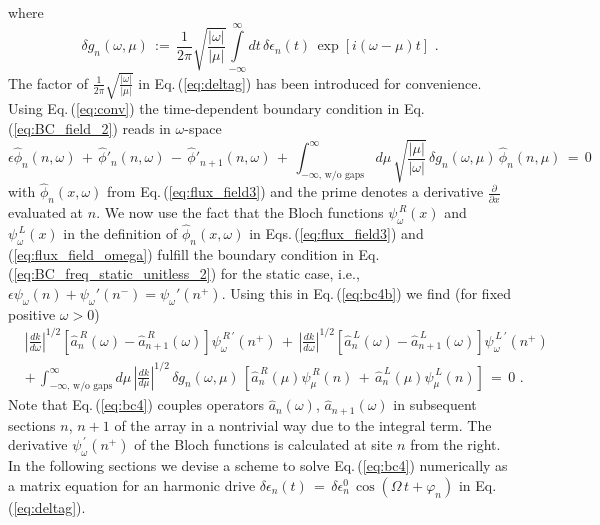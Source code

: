 %
where
%
\begin{equation} \label{eq:deltag}
\delta g_n(\omega, \mu) \, := \, \frac{1}{2 \pi}
\sqrt{\frac{|\omega|}{|\mu|}} \int\limits_{-\infty}^{\infty} dt \, \delta \epsilon_n(t) \, 
\exp\left[i (\omega-\mu) t \right] \, \, .
\end{equation}
%
The factor of $\displaystyle{\frac{1}{2 \pi} \sqrt{\frac{|\omega|}{|\mu|}}}$ 
in Eq.\,(\ref{eq:deltag}) has been introduced for convenience.
Using Eq.\,(\ref{eq:conv}) the time-dependent boundary condition in 
Eq.\,(\ref{eq:BC_field_2}) reads in $\omega$-space
%
\begin{equation} \label{eq:bc4b}
\epsilon \hat{\phi}_n(n,\omega) \, + \,
\hat{\phi}'_n(n,\omega) \, - \, \hat{\phi}'_{n+1}(n,\omega) \, + \,
\int_{-\infty, \, \text{w/o gaps}}^{\infty} d\mu \, \sqrt{\frac{|\mu|}{|\omega|}} \, 
\delta g_n(\omega, \mu) \, \hat{\phi}_n(n,\mu) 
 \, = \, 0
\end{equation}
%
with $\hat{\phi}_n(x,\omega)$ from Eq.\,(\ref{eq:flux_field3}) and
the prime denotes a derivative $\displaystyle{\frac{\partial}{\partial x}}$ evaluated at $n$.
We now use the fact that the Bloch functions $\psi_{\omega}^{\,R}(x)$ and $\psi_{\omega}^{\,L}(x)$
in the definition of $\hat{\phi}_n(x,\omega)$ in 
Eqs.\,(\ref{eq:flux_field3}) and (\ref{eq:flux_field_omega}) 
fulfill the boundary condition in Eq.\,(\ref{eq:BC_freq_static_unitless_2}) for the static case, 
i.e., $\epsilon \psi_{\omega}(n) + \psi_{\omega}'(n^-) = \psi_{\omega}'(n^+)$. 
Using this in Eq.\,(\ref{eq:bc4b}) we find (for fixed positive $\omega>0$)
%
\begin{equation} \label{eq:bc4}
\begin{split}
& \left| \frac{dk}{d\omega} \right|^{1/2} \left[ \hat{a}_n^{\,R}(\omega) - \hat{a}_{n+1}^{\,R}(\omega) \right] 
\psi_{\omega}^{\,R\,'}(n^+) \, + \, 
\left| \frac{dk}{d\omega} \right|^{1/2} \left[ \hat{a}_n^{\,L}(\omega) - \hat{a}_{n+1}^{\,L}(\omega) \right] 
\psi_{\omega}^{\,L\,'}(n^+) \\[3mm]
& + \, \int_{-\infty, \, \text{w/o gaps}}^{\infty} d\mu \, \left| \frac{dk}{d\mu} \right|^{1/2} \,
\delta g_n(\omega, \mu) \, 
\left[ \hat{a}_n^{\,R}(\mu) \psi_{\mu}^{\,R}(n) \, + \, 
    \hat{a}_n^{\,L}(\mu) \psi_{\mu}^{\,L}(n) \right] \, = \, 0 \, \, .
\end{split}
\end{equation}
%
\newpage
Note that Eq.\,(\ref{eq:bc4}) couples operators $\hat{a}_n(\omega)$, $\hat{a}_{n+1}(\omega)$ in 
subsequent sections $n$, $n+1$ of the array in a nontrivial way due to the integral term. 
The derivative $\psi_{\omega}^{\,'}(n^+)$ of the Bloch functions is calculated at site $n$ from the right. 
In the following sections we devise a scheme to solve Eq.\,(\ref{eq:bc4}) numerically as 
a matrix equation for an harmonic drive 
$\delta \epsilon_n(t) \, = \, \delta \epsilon_n^0 \, \cos(\Omega \, t + \varphi_n)$
in Eq.\,(\ref{eq:deltag}).


